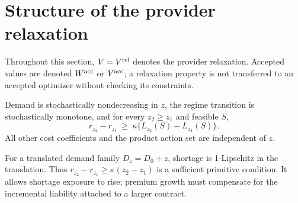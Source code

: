 \section{Structure of the provider relaxation}\label{sec:structure}
Throughout this section, $V=V^{\rm rel}$ denotes the provider relaxation. Accepted values are denoted $W^{\rm acc}$ or $V^{\rm acc}$; a relaxation property is not transferred to an accepted optimizer without checking its constraints.

\begin{assumption}\label{ass:lattice}
Demand is stochastically nondecreasing in $z$, the regime transition is stochastically monotone, and for every $z_2\geq z_1$ and feasible $S$,
\begin{equation}\label{eq:premium}
 r_{z_2}-r_{z_1}\ \geq\ \kappa\{L_{z_2}(S)-L_{z_1}(S)\}.
\end{equation}
All other cost coefficients and the product action set are independent of $z$.
\end{assumption}
For a translated demand family $D_z=D_0+z$, shortage is 1-Lipschitz in the translation. Thus $r_{z_2}-r_{z_1}\geq\kappa(z_2-z_1)$ is a sufficient primitive condition. It allows shortage exposure to rise; premium growth must compensate for the incremental liability attached to a larger contract.

